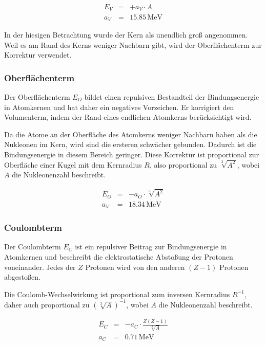 \documentclass[12pt,a4paper]{scrartcl}
\numberwithin{equation}{section} %
\renewcommand{\[}{} %
\renewcommand{\]}{\noindent} %
\begin{document}
\[
\begin{eqnarray}
        E_V &=& + a_V\cdot A \\
        a_V &=& 15.85\mathrm{\,MeV}
\end{eqnarray}
\]

In der hiesigen Betrachtung wurde der Kern als unendlich groß
angenommen. Weil es am Rand des Kerns weniger Nachbarn gibt, wird der
Oberflächenterm zur Korrektur verwendet.

\hypertarget{oberfluxe4chenterm}{%
\subsubsection{Oberflächenterm}\label{oberfluxe4chenterm}}

Der Oberflächenterm $E_O$ bildet einen repulsiven Bestandteil der
Bindungsenergie in Atomkernen und hat daher ein negatives Vorzeichen. Er
korrigiert den Volumenterm, indem der Rand eines endlichen Atomkerns
berücksichtigt wird.

Da die Atome an der Oberfläche des Atomkerns weniger Nachbarn haben als
die Nukleonen im Kern, wird sind die ersteren schwächer gebunden.
Dadurch ist die Bindungsenergie in diesem Bereich geringer. Diese
Korrektur ist proportional zur Oberfläche einer Kugel mit dem Kernradius
$R$, also proportional zu $\sqrt[3]{A^2}$, wobei $A$ die
Nukleonenzahl beschreibt.

\[
\begin{eqnarray}
        E_O &=& - a_O\cdot \sqrt[3]{A^2} \\
        a_V &=& 18.34\mathrm{\,MeV}
\end{eqnarray}
\]

\hypertarget{coulombterm}{%
\subsubsection{Coulombterm}\label{coulombterm}}

Der Coulombterm $E_C$ ist ein repulsiver Beitrag zur Bindungsenergie
in Atomkernen und beschreibt die elektrostatische Abstoßung der Protonen
voneinander. Jedes der $Z$ Protonen wird von den anderen $(Z-1)$
Protonen abgestoßen.

Die Coulomb-Wechselwirkung ist proportional zum inversen Kernradius
$R^{-1}$, daher auch proportional zu $(\sqrt[3]{A})^{-1}$, wobei
$A$ die Nukleonenzahl beschreibt.

\[
\begin{eqnarray}
        E_C &=& - a_C\cdot \frac{Z(Z-1)}{\sqrt[3]{A}} \\
        a_C &=& 0.71\mathrm{\,MeV}
\end{eqnarray}
\]
\end{document}
